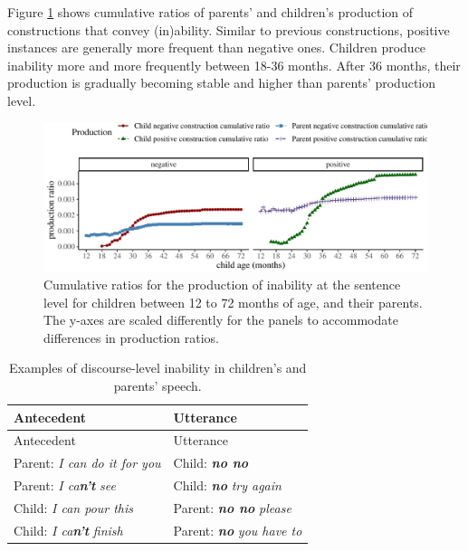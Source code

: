 \documentclass[
  english,
  man,floatsintext]{apa6}
\begin{document}
Figure \ref{fig:inability} shows cumulative ratios of parents' and children's production of constructions that convey (in)ability. Similar to previous constructions, positive instances are generally more frequent than negative ones. Children produce inability more and more frequently between 18-36 months. After 36 months, their production is gradually becoming stable and higher than parents' production level.

\begin{figure}[H]

{\centering \includegraphics{neg_construction_article_files/figure-latex/inability-1} 

}

\caption{Cumulative ratios for the production of inability at the sentence level for children between 12 to 72 months of age, and their parents. The y-axes are scaled differently for the panels to accommodate differences in production ratios.}\label{fig:inability}
\end{figure}

\begin{longtable}[]{@{}ll@{}}
\caption{\label{tab:disinability} Examples of discourse-level inability in children's and parents' speech.}\tabularnewline
\toprule
Antecedent & Utterance \\
\midrule
\endfirsthead
\toprule
Antecedent & Utterance \\
\midrule
\endhead
Parent: \emph{I can do it for you} & Child: \textbf{\emph{no no}} \\
Parent: \emph{I ca}\textbf{\emph{n't}} \emph{see} & Child: \textbf{\emph{no}} \emph{try again} \\
Child: \emph{I can pour this} & Parent: \textbf{\emph{no no}} \emph{please} \\
Child: \emph{I ca}\textbf{\emph{n't}} \emph{finish} & Parent: \textbf{\emph{no}} \emph{you have to} \\
\bottomrule
\end{longtable}
\end{document}
